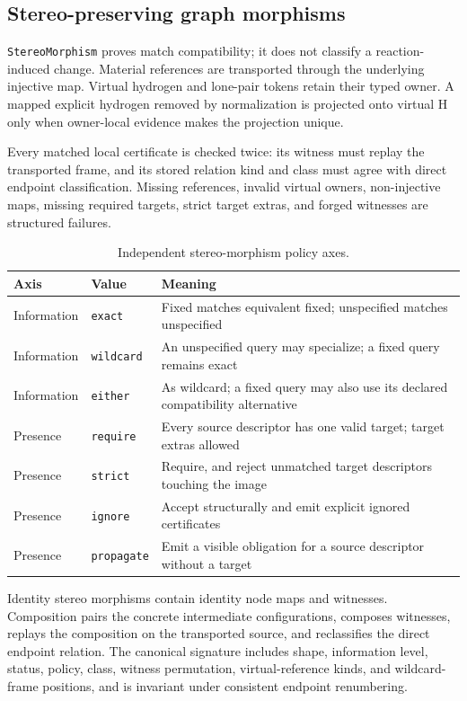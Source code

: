 \documentclass[pdflatex,sn-mathphys-num,referee,lineno]{sn-jnl}
\newcommand{\code}[1]{\texttt{#1}}
\theoremstyle{plain}
\theoremstyle{remark}
\theoremstyle{definition}
\begin{document}
\subsection{Stereo-preserving graph morphisms}

\code{StereoMorphism} proves match compatibility; it does not classify a
reaction-induced change. Material references are transported through the
underlying injective map.  Virtual hydrogen and lone-pair tokens retain their
typed owner.  A mapped explicit hydrogen removed by normalization is projected
onto virtual H only when owner-local evidence makes the projection unique.

Every matched local certificate is checked twice: its witness must replay the
transported frame, and its stored relation kind and class must agree with direct
endpoint classification.  Missing references, invalid virtual owners,
non-injective maps, missing required targets, strict target extras, and forged
witnesses are structured failures.

\begin{table}[htbp]
\caption{Independent stereo-morphism policy axes.}
\label{tab:policies}
\centering
\begin{tabularx}{\textwidth}{@{}llX@{}}
\toprule
Axis & Value & Meaning \\
\midrule
Information & \code{exact} & Fixed matches equivalent fixed; unspecified matches unspecified \\
Information & \code{wildcard} & An unspecified query may specialize; a fixed query remains exact \\
Information & \code{either} & As wildcard; a fixed query may also use its declared compatibility alternative \\
Presence & \code{require} & Every source descriptor has one valid target; target extras allowed \\
Presence & \code{strict} & Require, and reject unmatched target descriptors touching the image \\
Presence & \code{ignore} & Accept structurally and emit explicit ignored certificates \\
Presence & \code{propagate} & Emit a visible obligation for a source descriptor without a target \\
\bottomrule
\end{tabularx}
\end{table}

Identity stereo morphisms contain identity node maps and witnesses.  Composition
pairs the concrete intermediate configurations, composes witnesses, replays the
composition on the transported source, and reclassifies the direct endpoint
relation.  The canonical signature includes shape, information level, status,
policy, class, witness permutation, virtual-reference kinds, and wildcard-frame
positions, and is invariant under consistent endpoint renumbering.
\end{document}
